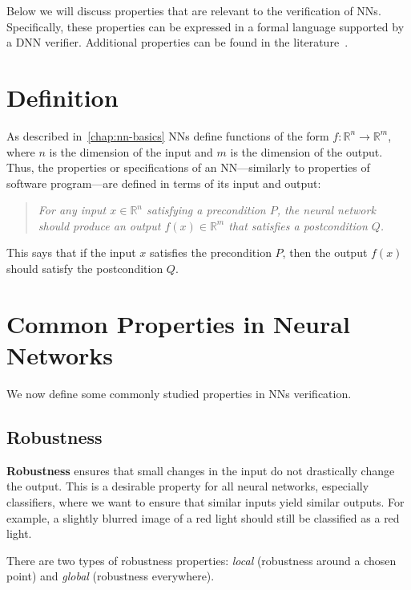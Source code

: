 \documentclass[oneside,11pt,dvipsnames]{book}
\numberwithin{equation}{section}
\theoremstyle{definition}
\theoremstyle{remark}
\begin{document}
Below we will discuss properties that are relevant to the verification of NNs. Specifically, these properties can be 
expressed in a formal language supported by a DNN verifier. Additional properties can be found in the literature~\cite{seshia2018formal}.

\section{Definition}\label{sec:properties-def}

As described in~\autoref{chap:nn-basics} NNs define functions of the form $f: \mathbb{R}^{n} \to \mathbb{R}^{m}$, 
where $n$ is the dimension of the input and $m$ is the dimension of the output. Thus, the properties or specifications of an NN---similarly to properties of software program---are defined in terms of its input and output:

\begin{quote}
\textit{For any input $x \in \mathbb{R}^{n}$ satisfying a precondition $P$, the neural network should produce an output $f(x) \in \mathbb{R}^{m}$ that satisfies a postcondition $Q$.}
\end{quote}

This says that if the input $x$ satisfies the precondition $P$, then the output $f(x)$ should satisfy the postcondition $Q$.



\section{Common Properties in Neural Networks}

We now define some commonly studied properties in NNs verification.

\subsection{Robustness}\label{sec:properties-robustness}

\textbf{Robustness} ensures that small changes in the input do not drastically change the output. This is a desirable property for all neural networks, especially classifiers, where we want to ensure that similar inputs yield similar outputs. For example, a slightly blurred image of a red light should still be classified as a red light.

There are two types of robustness properties: \emph{local} (robustness around a chosen point) and  \emph{global} (robustness everywhere).
\end{document}
